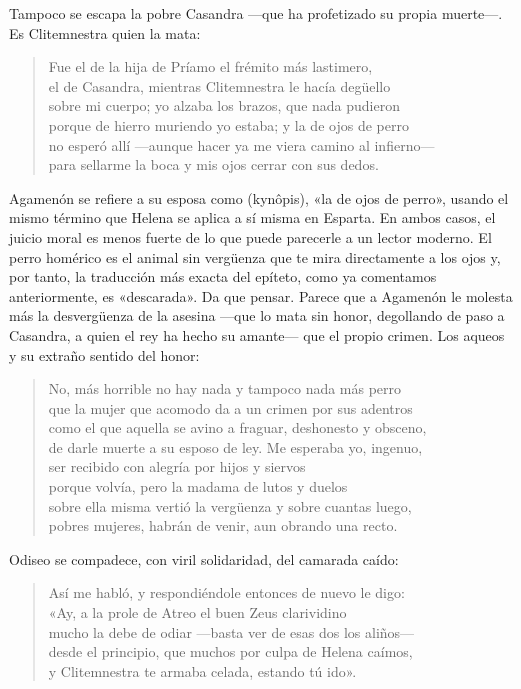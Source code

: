 Tampoco se escapa la pobre Casandra ---que ha profetizado su propia muerte---. Es Clitemnestra quien la mata:

\begin{verse}
Fue el de la hija de Príamo el frémito más lastimero,\\
el de Casandra, mientras Clitemnestra le hacía degüello\\
sobre mi cuerpo; yo alzaba los brazos, que nada pudieron\\
porque de hierro muriendo yo estaba; y la de ojos de perro\\
no esperó allí ---aunque hacer ya me viera camino al infierno---\\
para sellarme la boca y mis ojos cerrar con sus dedos.
\end{verse}

Agamenón se refiere a su esposa como  (kynôpis), «la de ojos de perro», usando el mismo término que Helena se aplica a sí misma en Esparta. En ambos casos, el juicio moral es menos fuerte de lo que puede parecerle a un lector moderno. El perro homérico es el animal sin vergüenza que te mira directamente a los ojos y, por tanto, la traducción más exacta del epíteto, como ya comentamos anteriormente, es «descarada». Da que pensar. Parece que a Agamenón le molesta más la desvergüenza de la asesina ---que lo mata sin honor, degollando de paso a Casandra, a quien el rey ha hecho su amante--- que el propio crimen. Los aqueos y su extraño sentido del honor:

\begin{verse}
No, más horrible no hay nada y tampoco nada más perro\\
que la mujer que acomodo da a un crimen por sus adentros\\
como el que aquella se avino a fraguar, deshonesto y obsceno,\\
de darle muerte a su esposo de ley. Me esperaba yo, ingenuo,\\
ser recibido con alegría por hijos y siervos\\
porque volvía, pero la madama de lutos y duelos\\
sobre ella misma vertió la vergüenza y sobre cuantas luego,\\
pobres mujeres, habrán de venir, aun obrando una recto.
\end{verse}

Odiseo se compadece, con viril solidaridad, del camarada caído:

\begin{verse}
Así me habló, y respondiéndole entonces de nuevo le digo:\\
«Ay, a la prole de Atreo el buen Zeus clarividino\\
mucho la debe de odiar ---basta ver de esas dos los aliños---\\
desde el principio, que muchos por culpa de Helena caímos,\\
y Clitemnestra te armaba celada, estando tú ido».
\end{verse}

